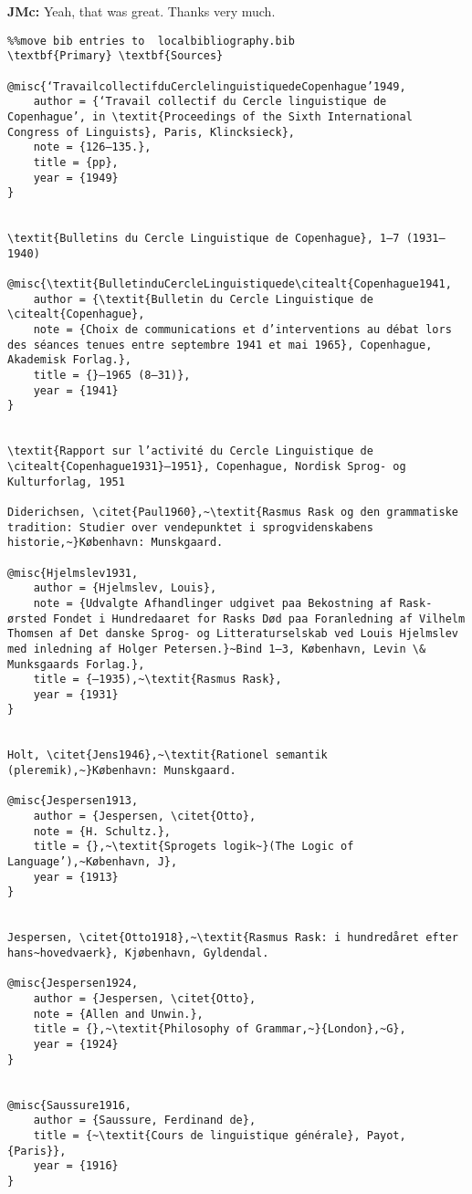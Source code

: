 \textbf{JMc:} Yeah, that was great. Thanks very much.
\begin{verbatim}%%move bib entries to  localbibliography.bib
\textbf{Primary} \textbf{Sources}

@misc{‘TravailcollectifduCerclelinguistiquedeCopenhague’1949,
	author = {‘Travail collectif du Cercle linguistique de Copenhague’, in \textit{Proceedings of the Sixth International Congress of Linguists}, Paris, Klincksieck},
	note = {126–135.},
	title = {pp},
	year = {1949}
}


\textit{Bulletins du Cercle Linguistique de Copenhague}, 1–7 (1931–1940)

@misc{\textit{BulletinduCercleLinguistiquede\citealt{Copenhague1941,
	author = {\textit{Bulletin du Cercle Linguistique de \citealt{Copenhague},
	note = {Choix de communications et d’interventions au débat lors des séances tenues entre septembre 1941 et mai 1965}, Copenhague, Akademisk Forlag.},
	title = {}–1965 (8–31)},
	year = {1941}
}


\textit{Rapport sur l’activité du Cercle Linguistique de \citealt{Copenhague1931}–1951}, Copenhague, Nordisk Sprog- og Kulturforlag, 1951

Diderichsen, \citet{Paul1960},~\textit{Rasmus Rask og den grammatiske tradition: Studier over vendepunktet i sprogvidenskabens historie,~}København: Munskgaard.

@misc{Hjelmslev1931,
	author = {Hjelmslev, Louis},
	note = {Udvalgte Afhandlinger udgivet paa Bekostning af Rask-ørsted Fondet i Hundredaaret for Rasks Død paa Foranledning af Vilhelm Thomsen af Det danske Sprog- og Litteraturselskab ved Louis Hjelmslev med inledning af Holger Petersen.}~Bind 1–3, København, Levin \& Munksgaards Forlag.},
	title = {–1935),~\textit{Rasmus Rask},
	year = {1931}
}


Holt, \citet{Jens1946},~\textit{Rationel semantik (pleremik),~}København: Munskgaard.

@misc{Jespersen1913,
	author = {Jespersen, \citet{Otto},
	note = {H. Schultz.},
	title = {},~\textit{Sprogets logik~}(The Logic of Language’),~København, J},
	year = {1913}
}


Jespersen, \citet{Otto1918},~\textit{Rasmus Rask: i hundredåret efter hans~hovedvaerk}, Kjøbenhavn, Gyldendal.

@misc{Jespersen1924,
	author = {Jespersen, \citet{Otto},
	note = {Allen and Unwin.},
	title = {},~\textit{Philosophy of Grammar,~}{London},~G},
	year = {1924}
}


@misc{Saussure1916,
	author = {Saussure, Ferdinand de},
	title = {~\textit{Cours de linguistique générale}, Payot, {Paris}},
	year = {1916}
}



\end{verbatim}
